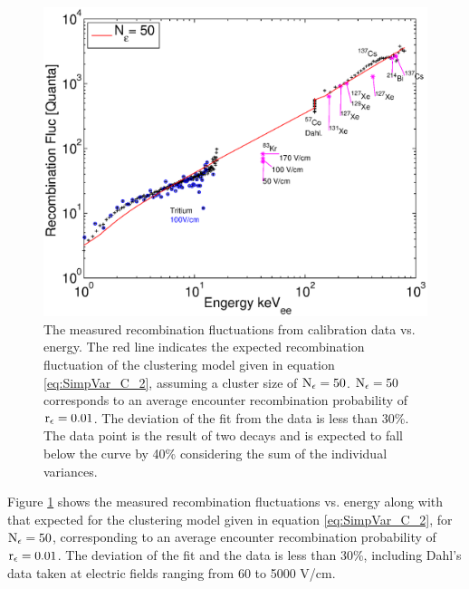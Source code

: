 \renewcommand{\baselinestretch}{1}
\small\normalsize
\begin{figure}[h!]\centering
\includegraphics[width=150mm]{Chapter_Flucs/Figures/Recomb_Flucs/Simple/R_v_E_model_stupid_simple_iter1.eps}
\caption{ The measured recombination fluctuations from calibration data vs. energy. The red line indicates the expected recombination fluctuation of the clustering model given in equation \ref{eq:SimpVar_C_2}, assuming a cluster size of $\rm N_\epsilon = 50$. $\rm N_\epsilon = 50$ corresponds to an average encounter recombination probability of $\rm r_\epsilon = 0.01$. The deviation of the fit from the data is less than 30\%. The \KrCal data point is the result of two decays and is expected to fall below the curve by 40\% considering the sum of the individual variances.}
\label{fig:Flucs_Simple}
\end{figure}
\renewcommand{\baselinestretch}{2}
\small\normalsize

\noindent Figure \ref{fig:Flucs_Simple} shows the measured recombination fluctuations vs. energy along with that expected for the clustering model given in equation \ref{eq:SimpVar_C_2}, for $\rm N_\epsilon =50 $, corresponding to an average encounter recombination probability of $\rm r_\epsilon = 0.01$. The deviation of the fit and the data is less than 30\%, including Dahl's data taken at electric fields ranging from 60 to 5000 V/cm. 

